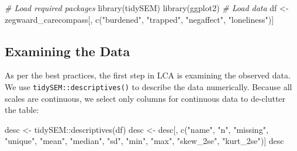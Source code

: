 \documentclass[
  man,floatsintext]{apa6}
\newenvironment{Shaded}{\begin{snugshade}}{\end{snugshade}}
\newcommand{\CommentTok}[1]{\textcolor[rgb]{0.56,0.35,0.01}{\textit{#1}}}
\newcommand{\FunctionTok}[1]{\textcolor[rgb]{0.00,0.00,0.00}{#1}}
\newcommand{\NormalTok}[1]{#1}
\newcommand{\OtherTok}[1]{\textcolor[rgb]{0.56,0.35,0.01}{#1}}
\newcommand{\SpecialCharTok}[1]{\textcolor[rgb]{0.00,0.00,0.00}{#1}}
\newcommand{\StringTok}[1]{\textcolor[rgb]{0.31,0.60,0.02}{#1}}
\begin{document}
\begin{Shaded}
\begin{Highlighting}[]
\CommentTok{\# Load required packages}
\FunctionTok{library}\NormalTok{(tidySEM) }
\FunctionTok{library}\NormalTok{(ggplot2)}
\CommentTok{\# Load data}
\NormalTok{df }\OtherTok{\textless{}{-}}\NormalTok{ zegwaard\_carecompass[, }\FunctionTok{c}\NormalTok{(}\StringTok{"burdened"}\NormalTok{, }\StringTok{"trapped"}\NormalTok{, }\StringTok{"negaffect"}\NormalTok{, }\StringTok{"loneliness"}\NormalTok{)]}
\end{Highlighting}
\end{Shaded}

\hypertarget{examining-the-data}{%
\subsection{Examining the Data}\label{examining-the-data}}

As per the best practices, the first step in LCA is examining the observed data.
We use \texttt{tidySEM::descriptives()} to describe the data numerically.
Because all scales are continuous, we select only columns for continuous data to de-clutter the table:

\begin{Shaded}
\begin{Highlighting}[]
\NormalTok{desc }\OtherTok{\textless{}{-}}\NormalTok{ tidySEM}\SpecialCharTok{::}\FunctionTok{descriptives}\NormalTok{(df)}
\NormalTok{desc }\OtherTok{\textless{}{-}}\NormalTok{ desc[, }\FunctionTok{c}\NormalTok{(}\StringTok{"name"}\NormalTok{, }\StringTok{"n"}\NormalTok{, }\StringTok{"missing"}\NormalTok{, }\StringTok{"unique"}\NormalTok{,}
                 \StringTok{"mean"}\NormalTok{, }\StringTok{"median"}\NormalTok{, }\StringTok{"sd"}\NormalTok{, }\StringTok{"min"}\NormalTok{, }\StringTok{"max"}\NormalTok{,}
                 \StringTok{"skew\_2se"}\NormalTok{, }\StringTok{"kurt\_2se"}\NormalTok{)]}
\NormalTok{desc}
\end{Highlighting}
\end{Shaded}
\end{document}
